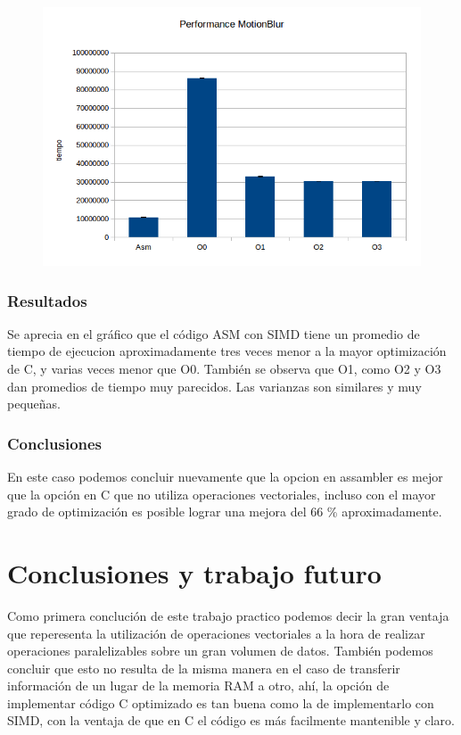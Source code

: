 \documentclass[a4paper]{article}
\begin{document}
\begin{figure}[h!]
  \begin{center}
  \includegraphics[scale=0.66]{Graficos1.4/mbl/per.jpg}
  \label{nombreparareferenciar11}
  \end{center}
\end{figure}

\subsubsection{Resultados}
Se aprecia en el gráfico que el código ASM con SIMD tiene un promedio de tiempo de ejecucion aproximadamente tres veces menor a la mayor optimización de C, y varias veces menor que O0. También se observa que O1, como O2 y O3 dan promedios de tiempo muy parecidos. Las varianzas son similares y muy pequeñas.

\subsubsection{Conclusiones}

En este caso podemos concluir nuevamente que la opcion en assambler es mejor que la opción en C que no utiliza operaciones vectoriales, incluso con el mayor grado de optimización es posible lograr una mejora del 66 \% aproximadamente.

\newpage
\section{Conclusiones y trabajo futuro}

Como primera conclución de este trabajo practico podemos decir la gran ventaja que reperesenta la utilización de operaciones vectoriales a la hora de realizar operaciones paralelizables sobre un gran volumen de datos. También podemos concluir que esto no resulta de la misma manera en el caso de transferir información de un lugar de la memoria RAM a otro, ahí, la opción de implementar código C optimizado es tan buena como la de implementarlo con SIMD, con la ventaja de que en C el código es más facilmente mantenible y claro.
\end{document}
